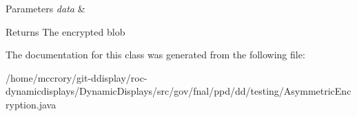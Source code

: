 \begin{DoxyParams}{Parameters}
{\em data} & \\
\hline
\end{DoxyParams}
\begin{DoxyReturn}{Returns}
The encrypted blob 
\end{DoxyReturn}


The documentation for this class was generated from the following file\-:\begin{DoxyCompactItemize}
\item 
/home/mccrory/git-\/ddisplay/roc-\/dynamicdisplays/\-Dynamic\-Displays/src/gov/fnal/ppd/dd/testing/Asymmetric\-Encryption.\-java\end{DoxyCompactItemize}
